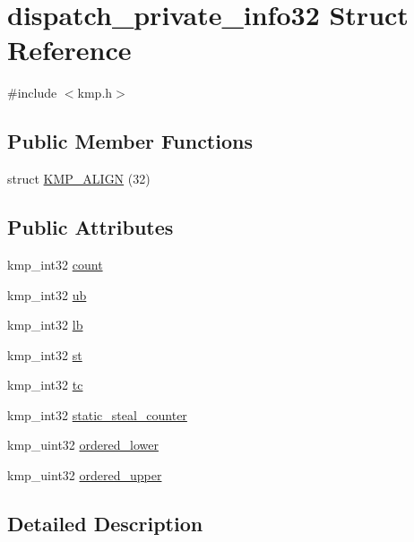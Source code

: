 \hypertarget{structdispatch__private__info32}{\section{dispatch\-\_\-private\-\_\-info32 Struct Reference}
\label{structdispatch__private__info32}
}


{\ttfamily \#include $<$kmp.\-h$>$}

\subsection*{Public Member Functions}
\begin{DoxyCompactItemize}
\item 
struct \hyperlink{structdispatch__private__info32_a59a2af75c92e58d67844d9c9723144d1}{K\-M\-P\-\_\-\-A\-L\-I\-G\-N} (32)
\end{DoxyCompactItemize}
\subsection*{Public Attributes}
\begin{DoxyCompactItemize}
\item 
kmp\-\_\-int32 \hyperlink{structdispatch__private__info32_ad4e1ba3a5926a77583047a30c2319c8f}{count}
\item 
kmp\-\_\-int32 \hyperlink{structdispatch__private__info32_a2f5539b2d4b0802837e6b4efcf40e339}{ub}
\item 
kmp\-\_\-int32 \hyperlink{structdispatch__private__info32_aceda8da59ca95fb14f9b1f34815ea7f5}{lb}
\item 
kmp\-\_\-int32 \hyperlink{structdispatch__private__info32_a84a2005ae95339dee87541a39ea4d0ab}{st}
\item 
kmp\-\_\-int32 \hyperlink{structdispatch__private__info32_a406e796c32b90d31e576b523049f8557}{tc}
\item 
kmp\-\_\-int32 \hyperlink{structdispatch__private__info32_a10071a978613d4d659ce187d74e2c8fc}{static\-\_\-steal\-\_\-counter}
\item 
kmp\-\_\-uint32 \hyperlink{structdispatch__private__info32_ac0b2dc8bb1c33ff7e516a258dab4316a}{ordered\-\_\-lower}
\item 
kmp\-\_\-uint32 \hyperlink{structdispatch__private__info32_afc1a1143b8cbe39b41ed6420e0f0e0ef}{ordered\-\_\-upper}
\end{DoxyCompactItemize}


\subsection{Detailed Description}


